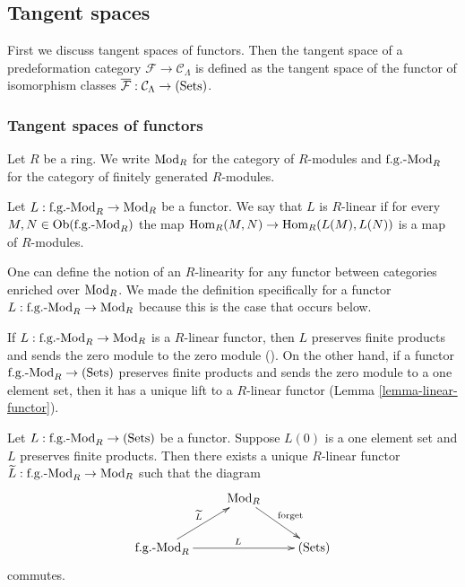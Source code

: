 \subsection{Tangent spaces}
First we discuss tangent spaces of functors. Then the tangent space of a 
predeformation category $\mathcal F \rightarrow \mathcal C_{\Lambda}$ is 
defined as the tangent space of the functor of isomorphism classes 
$\overline{\mathcal F}: \mathcal C_{\Lambda} \rightarrow \textnormal{(Sets)}$.

\subsubsection{Tangent spaces of functors}
Let $R$ be a ring. We write $\textnormal{Mod}_{R}$ for the category of 
$R$-modules and $\textnormal{f.g.-Mod}_{R}$ for the category of finitely 
generated $R$-modules.

\begin{definition}
Let $L: \textnormal{f.g.-Mod}_{R} \rightarrow \textnormal{Mod}_{R}$ be a 
functor.  We say that $L$ is $R$-linear if for every $M,N \in 
\textnormal{Ob}(\textnormal{f.g.-Mod}_{R})$ the map $\textnormal{Hom}_{R}(M,N) 
\rightarrow \textnormal{Hom}_{R}(L(M),L(N))$ is a map of $R$-modules.
\end{definition}

\begin{remark}
One can define the notion of an $R$-linearity for any functor between 
categories enriched over $\textnormal{Mod}_{R}$. We made the definition 
specifically for a functor $L: \textnormal{f.g.-Mod}_{R} \rightarrow 
\textnormal{Mod}_{R}$ because this is the case that occurs below.
\end{remark}

\begin{remark}
\label{remark-linear-functor}
If $L: \textnormal{f.g.-Mod}_{R} \rightarrow \textnormal{Mod}_{R}$ is a 
$R$-linear functor, then $L$ preserves finite products and sends the zero 
module to the zero module (\cite[Lemma 9.3.7]{stacks-project}).  On the other 
hand, if a functor $\textnormal{f.g.-Mod}_{R} \rightarrow \textnormal{(Sets)}$ 
preserves finite products and sends the zero module to a one element set, then 
it has a unique lift to a $R$-linear functor (Lemma \ref{lemma-linear-functor}).
\end{remark}

\begin{lemma}
\label{lemma-linear-functor}
Let $L: \textnormal{f.g.-Mod}_{R} \rightarrow \textnormal{(Sets)}$ be a 
functor.  Suppose $L(0)$ is a one element set and $L$ preserves finite 
products.  Then there exists a unique $R$-linear functor $\widetilde{L}: 
\textnormal{f.g.-Mod}_{R} \rightarrow \textnormal{Mod}_{R}$ such that the 
diagram
\[ 
\xymatrix{
& \textnormal{Mod}_{R} \ar[dr]^{\textnormal{forget}} &   \\
\textnormal{f.g.-Mod}_{R}  \ar[ur]^{\widetilde{L}} \ar[rr]^{L} &  & 
\textnormal{(Sets)}
}
\]
commutes.
\end{lemma}

